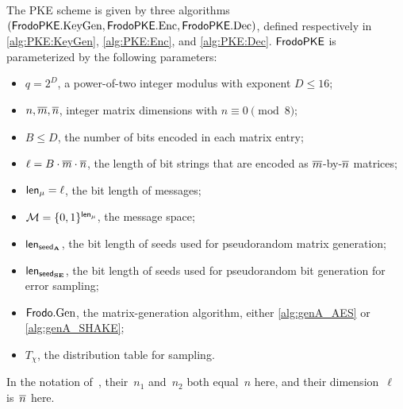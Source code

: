 \documentclass{iacrcc}
\begin{document}
The PKE scheme is given by three algorithms
$(\textsf{\upshape\mdseries FrodoPKE}.\textrm{\upshape\mdseries KeyGen}, \textsf{\upshape\mdseries FrodoPKE}.\textrm{\upshape\mdseries Enc}, \textsf{\upshape\mdseries FrodoPKE}.\textrm{\upshape\mdseries Dec})$, defined
respectively in \autoref{alg:PKE:KeyGen}, \autoref{alg:PKE:Enc}, and
\autoref{alg:PKE:Dec}.  $\textsf{\upshape\mdseries FrodoPKE}$ is parameterized by the following
parameters:
\begin{itemize}
\item $q=2^D$, a power-of-two integer modulus with exponent $D \leq 16$;
\item $n, \overline{m}, \overline{n}$, integer matrix dimensions with $n \equiv 0 \pmod 8$;
\item $B \leq D$, the number of bits encoded in each matrix entry;
\item $\ell=B\cdot \overline{m}\cdot\overline{n}$, the length of bit strings that are encoded as $\overline{m}$-by-$\overline{n}$ matrices;
\item ${\mathsf{len}_{\mu}} = \ell$, the bit length of messages;
\item $\mathcal{M} = \{0,1\}^{\mathsf{len}_{\mu}}$, the message space;
\item ${\mathsf{len}_{{\mathsf{seed}_{\mathbf{A}}}}}$, the bit length of seeds used for pseudorandom matrix generation;
\item ${\mathsf{len}_{{\mathsf{seed}_{\mathbf{S}\mathbf{E}}}}}$, the bit length of seeds used for pseudorandom bit generation for error sampling;
\item $\textsf{\upshape\mdseries Frodo}.\textrm{\upshape\mdseries Gen}$, the matrix-generation algorithm, either \autoref{alg:genA_AES} or \autoref{alg:genA_SHAKE};
\item $T_\chi$, the distribution table for sampling.
\end{itemize}
In the notation of~\cite{RSA:LinPei11}, their~$n_1$ and~$n_2$ both
equal~$n$ here, and their dimension~$\ell$ is~$\overline{n}$ here.
\end{document}
